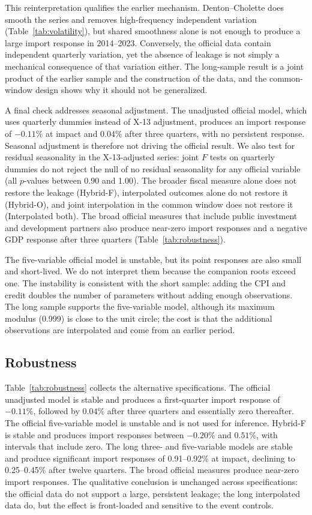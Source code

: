 \documentclass[11pt,a4paper]{article}
\begin{document}
This reinterpretation qualifies the earlier mechanism. Denton--Cholette does smooth the series and removes high-frequency independent variation (Table~\ref{tab:volatility}), but shared smoothness alone is not enough to produce a large import response in 2014--2023. Conversely, the official data contain independent quarterly variation, yet the absence of leakage is not simply a mechanical consequence of that variation either. The long-sample result is a joint product of the earlier sample and the construction of the data, and the common-window design shows why it should not be generalized.

A final check addresses seasonal adjustment. The unadjusted official model, which uses quarterly dummies instead of X-13 adjustment, produces an import response of $-0.11\%$ at impact and $0.04\%$ after three quarters, with no persistent response. Seasonal adjustment is therefore not driving the official result. We also test for residual seasonality in the X-13-adjusted series: joint $F$ tests on quarterly dummies do not reject the null of no residual seasonality for any official variable (all $p$-values between 0.90 and 1.00). The broader fiscal measure alone does not restore the leakage (Hybrid-F), interpolated outcomes alone do not restore it (Hybrid-O), and joint interpolation in the common window does not restore it (Interpolated both). The broad official measures that include public investment and development partners also produce near-zero import responses and a negative GDP response after three quarters (Table~\ref{tab:robustness}).

The five-variable official model is unstable, but its point responses are also small and short-lived. We do not interpret them because the companion roots exceed one. The instability is consistent with the short sample: adding the CPI and credit doubles the number of parameters without adding enough observations. The long sample supports the five-variable model, although its maximum modulus (0.999) is close to the unit circle; the cost is that the additional observations are interpolated and come from an earlier period.

\subsection{Robustness}
\label{sec:robustness}

Table~\ref{tab:robustness} collects the alternative specifications. The official unadjusted model is stable and produces a first-quarter import response of $-0.11\%$, followed by $0.04\%$ after three quarters and essentially zero thereafter. The official five-variable model is unstable and is not used for inference. Hybrid-F is stable and produces import responses between $-0.20\%$ and $0.51\%$, with intervals that include zero. The long three- and five-variable models are stable and produce significant import responses of 0.91--0.92\% at impact, declining to 0.25--0.45\% after twelve quarters. The broad official measures produce near-zero import responses. The qualitative conclusion is unchanged across specifications: the official data do not support a large, persistent leakage; the long interpolated data do, but the effect is front-loaded and sensitive to the event controls.
\end{document}
